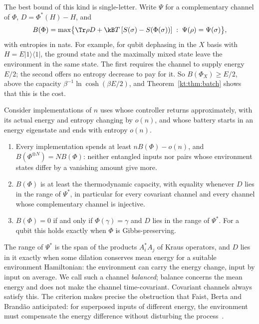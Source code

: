 The best bound of this kind is single-letter. Write $\Psi$ for a complementary channel of $\Phi$, $D=\Phi^*(H)-H$, and
\[
B(\Phi)=\max\bigl\{\Tr\rho D+\kB T\,[S(\sigma)-S(\Phi(\sigma))]\;:\;\Psi(\rho)=\Psi(\sigma)\bigr\},
\]
with entropies in nats. For example, for qubit dephasing in the $X$ basis with $H=E|1\rangle\langle1|$, the ground state and the maximally mixed state leave the environment in the same state. The first requires the channel to supply energy $E/2$; the second offers no entropy decrease to pay for it. So $B(\Phi_X)\ge E/2$, above the capacity $\beta^{-1}\ln\cosh(\beta E/2)$, and Theorem~\ref{kt:thm:batch} shows that this is the cost.

\begin{proposition}\label{kt:prop:single}
Consider implementations of $n$ uses whose controller returns approximately, with its actual energy and entropy changing by $o(n)$, and whose battery starts in an energy eigenstate and ends with entropy $o(n)$.
\begin{enumerate}[label=(\alph*)]
\item Every implementation spends at least $nB(\Phi)-o(n)$, and $B(\Phi^{\otimes N})=NB(\Phi)$: neither entangled inputs nor pairs whose environment states differ by a vanishing amount give more.
\item $B(\Phi)$ is at least the thermodynamic capacity, with equality whenever $D$ lies in the range of $\Psi^*$, in particular for every covariant channel and every channel whose complementary channel is injective.
\item $B(\Phi)=0$ if and only if $\Phi(\gamma)=\gamma$ and $D$ lies in the range of $\Psi^*$. For a qubit this holds exactly when $\Phi$ is Gibbs-preserving.
\end{enumerate}
\end{proposition}

The range of $\Psi^*$ is the span of the products $A_i^*A_j$ of Kraus operators, and $D$ lies in it exactly when some dilation conserves mean energy for a suitable environment Hamiltonian: the environment can carry the energy change, input by input on average. We call such a channel \emph{balanced}; balance concerns the mean energy and does not make the channel time-covariant. Covariant channels always satisfy this. The criterion makes precise the obstruction that Faist, Berta and Brand\~ao anticipated: for superposed inputs of different energy, the environment must compensate the energy difference without disturbing the process~\cite{FBB19}.

